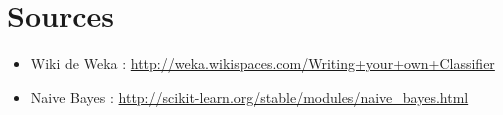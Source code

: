 \documentclass{article}
\begin{document}
\newpage
\section{Sources}
\begin{itemize}
\item Wiki de Weka \label{weka}: \href{http://weka.wikispaces.com/Writing+your+own+Classifier}{http://weka.wikispaces.com/Writing+your+own+Classifier}
 \\
\item Naive Bayes  : \href{$http://scikit-learn.org/stable/modules/naive_bayes.html$}{http://scikit-learn.org/stable/modules/naive\_bayes.html}


\end{itemize}



\end{document}
